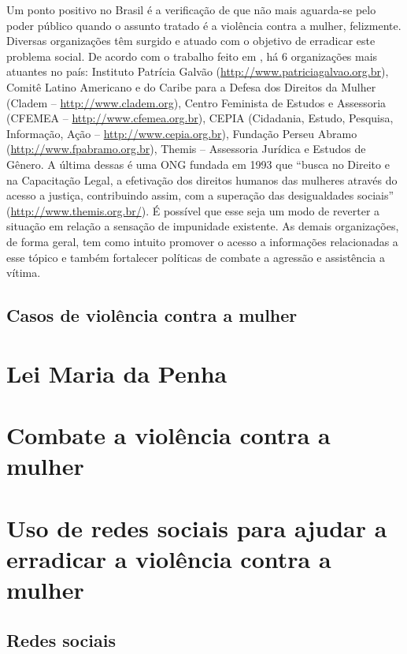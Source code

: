 \documentclass[12pt]{article}
\begin{document}
Um ponto positivo no Brasil é a verificação de que não mais aguarda-se
pelo poder público
quando o assunto tratado é a violência contra a mulher,
felizmente. Diversas organizações têm surgido e atuado com o objetivo
de erradicar este problema social. De acordo com o trabalho feito em
\cite{avon1}, há 6 organizações mais atuantes no país: Instituto Patrícia
Galvão (\url{http://www.patriciagalvao.org.br}), Comitê Latino Americano e do Caribe para a Defesa dos Direitos
da Mulher (Cladem -- \url{http://www.cladem.org}), Centro Feminista de
Estudos e Assessoria (CFEMEA -- \url{http://www.cfemea.org.br}),
CEPIA (Cidadania, Estudo, Pesquisa, Informação, Ação --
\url{http://www.cepia.org.br}), Fundação Perseu
Abramo (\url{http://www.fpabramo.org.br}), Themis -- Assessoria
Jurídica e Estudos de Gênero. A última
dessas é uma ONG fundada em 1993 que ``busca no Direito e na
Capacitação Legal, a
efetivação dos direitos humanos das mulheres através do acesso a
justiça, contribuindo assim, com a superação das desigualdades
sociais'' (\url{http://www.themis.org.br/}). É possível que esse seja
um modo de reverter a situação em relação a sensação de impunidade
existente. As demais organizações, de forma geral, tem como intuito
promover o acesso a informações relacionadas a esse tópico e também
fortalecer políticas de combate a agressão e assistência a vítima.

\subsection{Casos de violência contra a mulher}


\section{Lei Maria da Penha}


\section{Combate a violência contra a mulher}


\section{Uso de redes sociais para ajudar a erradicar a violência
  contra a mulher}

\subsection{Redes sociais}
\end{document}
